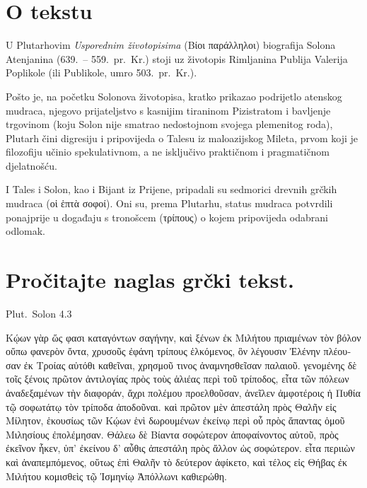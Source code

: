 


\section*{O tekstu}

U Plutarhovim \textit{Usporednim životopisima} \textgreek[variant=ancient]{(Βίοι παράλληλοι)} biografija Solona Atenjanina (639.\ – 559.\ pr.~Kr.) stoji uz životopis Rimljanina Publija Valerija Poplikole (ili Publikole, umro 503.\ pr.~Kr.).

Pošto je, na početku Solonova životopisa, kratko prikazao podrijetlo atenskog mudraca, njegovo prijateljstvo s kasnijim tiraninom Pizistratom i bavljenje trgovinom (koju Solon nije smatrao nedostojnom svojega plemenitog roda), Plutarh čini digresiju i pripovijeda o Talesu iz maloazijskog Mileta, prvom koji je filozofiju učinio spekulativnom, a ne isključivo praktičnom i pragmatičnom djelatnošću. 

I Tales i Solon, kao i Bijant iz Prijene, pripadali su sedmorici drevnih grčkih mudraca \textgreek[variant=ancient]{(οἱ ἑπτὰ σοφοί).} Oni su, prema Plutarhu, status mudraca potvrdili ponajprije u događaju s tronošcem \textgreek[variant=ancient]{(τρίπους)} o kojem pripovijeda odabrani odlomak.


\section*{Pročitajte naglas grčki tekst.}

Plut.\ Solon 4.3

\medskip

{\large
\begin{greek}
\noindent Κῴων γὰρ ὥς φασι καταγόντων σαγήνην, καὶ ξένων ἐκ Μιλήτου πριαμένων τὸν βόλον οὔπω φανερὸν ὄντα, χρυσοῦς ἐφάνη τρίπους ἑλκόμενος, ὃν λέγουσιν Ἐλένην πλέουσαν ἐκ Τροίας αὐτόθι καθεῖναι, χρησμοῦ τινος ἀναμνησθεῖσαν παλαιοῦ. γενομένης δὲ τοῖς ξένοις πρῶτον ἀντιλογίας πρὸς τοὺς ἁλιέας περὶ τοῦ τρίποδος, εἶτα τῶν πόλεων ἀναδεξαμένων τὴν διαφοράν, ἄχρι πολέμου προελθοῦσαν, ἀνεῖλεν ἀμφοτέροις ἡ Πυθία τῷ σοφωτάτῳ τὸν τρίποδα ἀποδοῦναι. καὶ πρῶτον μὲν ἀπεστάλη πρὸς Θαλῆν εἰς Μίλητον, ἑκουσίως τῶν Κῴων ἑνὶ δωρουμένων ἐκείνῳ περὶ οὗ πρὸς ἅπαντας ὁμοῦ Μιλησίους ἐπολέμησαν. Θάλεω δὲ Βίαντα σοφώτερον ἀποφαίνοντος αὑτοῦ, πρὸς ἐκεῖνον ἧκεν, ὑπ' ἐκείνου δ' αὖθις ἀπεστάλη πρὸς ἄλλον ὡς σοφώτερον. εἶτα περιιὼν καὶ ἀναπεμπόμενος, οὕτως ἐπὶ Θαλῆν τὸ δεύτερον ἀφίκετο, καὶ τέλος εἰς Θήβας ἐκ Μιλήτου κομισθεὶς τῷ Ἰσμηνίῳ Ἀπόλλωνι καθιερώθη.

\end{greek}

}

